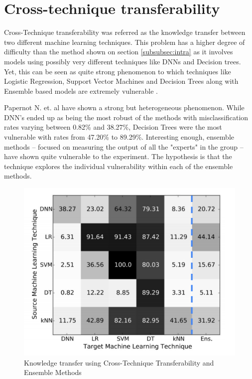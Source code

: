 \section{Cross-technique transferability}
Cross-Technique transferability was referred as the knowledge transfer between two different machine learning techniques. This problem has a higher degree of difficulty than the method shown on section \ref{subsubsec:intra} as it involves models using possibly very different techniques like DNNs and Decision trees. Yet, this can be seen as quite strong phenomenon to which techniques like Logistic Regression, Support Vector Machines and Decision Trees along with Ensemble based models are extremely vulnerable \cite{papernot2016transf}.

Papernot N. et. al \cite{papernot2016transf} have shown a strong but heterogeneous phenomenon. While DNN's ended up as being the most robust of the methods with misclassification rates varying between 0.82\% and 38.27\%, Decision Trees were the most vulnerable with rates from 47.20\% to 89.29\%. Interesting enough, ensemble methods -- focused on measuring the output of all the "experts" in the group -- have shown quite vulnerable to the experiment. The hypothesis is that the technique explores the individual vulnerability within each of the ensemble methods.

\begin{figure}[!h]
\centering
	\includegraphics[scale=0.6]{cross.png}
\caption{Knowledge transfer using Cross-Technique Transferability and Ensemble Methods \cite{papernot2016transf}}
\label{fig:cross}
\end{figure}

